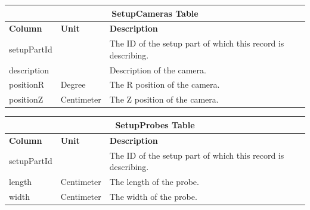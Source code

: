 \documentclass{sig-alternate}
\begin{document}
\begin{table}[h!]
\centering
\begin{tabular}{l l p{4.6cm}}
\multicolumn{3}{c}{\bf SetupCameras Table} \\ \hline
{\bf Column} & {\bf Unit} & {\bf Description}\\ \hline
setupPartId & & The ID of the setup part of which this record is describing.\\ \hline
description & & Description of the camera.\\ \hline
positionR & Degree & The R position of the camera.\\ \hline
positionZ & Centimeter & The Z position of the camera.\\ \hline
\end{tabular}
\end{table}

\begin{table}[h!]
\centering
\begin{tabular}{l l p{4.6cm}}
\multicolumn{3}{c}{\bf SetupProbes Table} \\ \hline
{\bf Column} & {\bf Unit} & {\bf Description}\\ \hline
setupPartId & & The ID of the setup part of which this record is describing.\\ \hline
length & Centimeter & The length of the probe.\\ \hline
width & Centimeter & The width of the probe.\\ \hline
\end{tabular}
\end{table}
\end{document}

